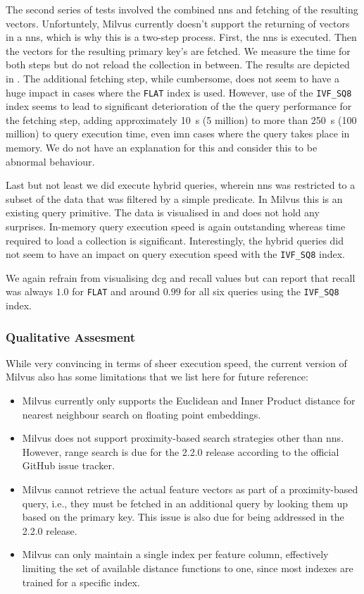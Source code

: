 The second series of tests involved the combined \acrshort{nns} and fetching of the resulting vectors. Unfortuntely, Milvus currently doesn't support the returning of vectors in a \acrshort{nns}, which is why this is a two-step process. First, the \acrshort{nns} is executed. Then the vectors for the resulting primary key's are fetched. We measure the time for both steps but do not reload the collection in between. The results are depicted in . The additional fetching step, while cumbersome, does not seem to have a huge impact in cases where the \texttt{FLAT} index is used. However, use of the \texttt{IVF\_SQ8} index seems to lead to significant deterioration of the the query performance for the fetching step, adding approximately \SI{10}{\second} (5 million) to more than \SI{250}{\second} (100 million) to query execution time, even imn cases where the query takes place in memory. We do not have an explanation for this and consider this to be abnormal behaviour.

Last but not least we did execute hybrid queries, wherein \acrshort{nns} was restricted to a subset of the data that was filtered by a simple predicate. In Milvus this is an existing query primitive. The data is visualised in  and does not hold any surprises. In-memory query execution speed is again outstanding whereas time required to load a collection is significant. Interestingly, the hybrid queries did not seem to have an impact on query execution speed with the \texttt{IVF\_SQ8} index.

We again refrain from visualising \acrshort{dcg} and recall values but can report that recall was always $1.0$ for \texttt{FLAT} and around $0.99$ for all six queries using the \texttt{IVF\_SQ8} index.

\subsubsection{Qualitative Assesment}
While very convincing in terms of sheer execution speed, the current version of Milvus also has some limitations that we list here for future reference:

\begin{itemize}
    \item Milvus currently only supports the Euclidean and Inner Product distance for nearest neighbour search on floating point embeddings.
    \item Milvus does not support proximity-based search strategies other than \acrshort{nns}. However, range search is due for the 2.2.0 release according to the official GitHub issue tracker.
    \item Milvus cannot retrieve the actual feature vectors as part of a proximity-based query, i.e., they must be fetched in an additional query by looking them up based on the primary key. This issue is also due for being addressed in the 2.2.0 release.
    \item Milvus can only maintain a single index per feature column, effectively limiting the set of available distance functions to one, since most indexes are trained for a specific index.
\end{itemize}

